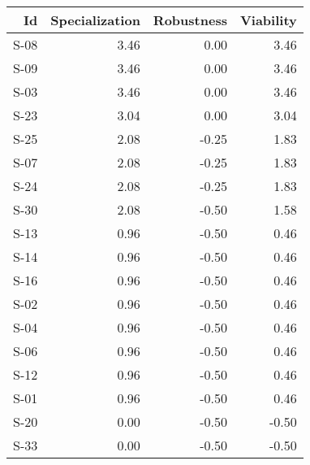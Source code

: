 \begin{tabular}{ | r | r | r | r | }
    \hline
                    Id  &  Specialization  &      Robustness  &       Viability  \\
    \hline
    \hline
                  S-08  &            3.46  &            0.00  &            3.46  \\
    \hline
                  S-09  &            3.46  &            0.00  &            3.46  \\
    \hline
                  S-03  &            3.46  &            0.00  &            3.46  \\
    \hline
                  S-23  &            3.04  &            0.00  &            3.04  \\
    \hline
                  S-25  &            2.08  &           -0.25  &            1.83  \\
    \hline
                  S-07  &            2.08  &           -0.25  &            1.83  \\
    \hline
                  S-24  &            2.08  &           -0.25  &            1.83  \\
    \hline
                  S-30  &            2.08  &           -0.50  &            1.58  \\
    \hline
                  S-13  &            0.96  &           -0.50  &            0.46  \\
    \hline
                  S-14  &            0.96  &           -0.50  &            0.46  \\
    \hline
                  S-16  &            0.96  &           -0.50  &            0.46  \\
    \hline
                  S-02  &            0.96  &           -0.50  &            0.46  \\
    \hline
                  S-04  &            0.96  &           -0.50  &            0.46  \\
    \hline
                  S-06  &            0.96  &           -0.50  &            0.46  \\
    \hline
                  S-12  &            0.96  &           -0.50  &            0.46  \\
    \hline
                  S-01  &            0.96  &           -0.50  &            0.46  \\
    \hline
                  S-20  &            0.00  &           -0.50  &           -0.50  \\
    \hline
                  S-33  &            0.00  &           -0.50  &           -0.50  \\

\end{tabular}
